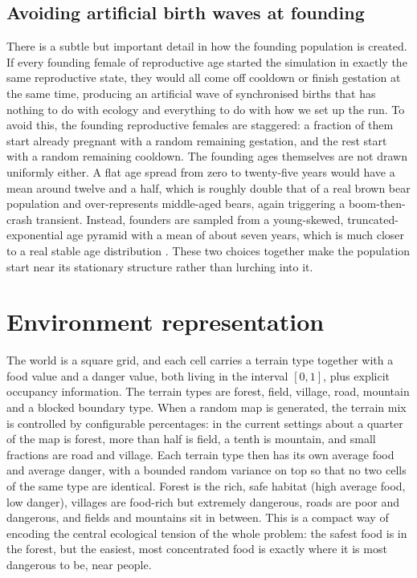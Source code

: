 \subsection{Avoiding artificial birth waves at founding}

There is a subtle but important detail in how the founding population is created. If every founding female of reproductive age started the simulation in exactly the same reproductive state, they would all come off cooldown or finish gestation at the same time, producing an artificial wave of synchronised births that has nothing to do with ecology and everything to do with how we set up the run. To avoid this, the founding reproductive females are staggered: a fraction of them start already pregnant with a random remaining gestation, and the rest start with a random remaining cooldown. The founding ages themselves are not drawn uniformly either. A flat age spread from zero to twenty-five years would have a mean around twelve and a half, which is roughly double that of a real brown bear population and over-represents middle-aged bears, again triggering a boom-then-crash transient. Instead, founders are sampled from a young-skewed, truncated-exponential age pyramid with a mean of about seven years, which is much closer to a real stable age distribution \cite{Swenson1997,GrimmRailsback2005}. These two choices together make the population start near its stationary structure rather than lurching into it.

\section{Environment representation}

The world is a square grid, and each cell carries a terrain type together with a food value and a danger value, both living in the interval $[0, 1]$, plus explicit occupancy information. The terrain types are forest, field, village, road, mountain and a blocked boundary type. When a random map is generated, the terrain mix is controlled by configurable percentages: in the current settings about a quarter of the map is forest, more than half is field, a tenth is mountain, and small fractions are road and village. Each terrain type then has its own average food and average danger, with a bounded random variance on top so that no two cells of the same type are identical. Forest is the rich, safe habitat (high average food, low danger), villages are food-rich but extremely dangerous, roads are poor and dangerous, and fields and mountains sit in between. This is a compact way of encoding the central ecological tension of the whole problem: the safest food is in the forest, but the easiest, most concentrated food is exactly where it is most dangerous to be, near people.

